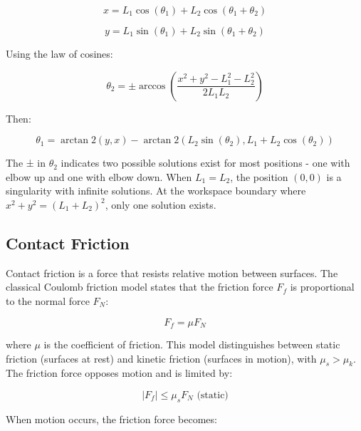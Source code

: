     \begin{equation}
    x = L_1 \cos(\theta_1) + L_2 \cos(\theta_1 + \theta_2)
    \end{equation}
    
    \begin{equation}
    y = L_1 \sin(\theta_1) + L_2 \sin(\theta_1 + \theta_2)
    \end{equation}
    
    Using the law of cosines:
    
    \begin{equation}
    \theta_2 = \pm \arccos\left(\frac{x^2 + y^2 - L_1^2 - L_2^2}{2L_1L_2}\right)
    \end{equation}
    
    Then:
    
    \begin{equation}
    \theta_1 = \arctan2(y,x) - \arctan2(L_2\sin(\theta_2), L_1 + L_2\cos(\theta_2))
    \end{equation}
    
    The ± in \(\theta_2\) indicates two possible solutions exist for most positions - one with elbow up and one with elbow down. When \(L_1 = L_2\), the position \((0,0)\) is a singularity with infinite solutions. At the workspace boundary where \(x^2 + y^2 = (L_1 + L_2)^2\), only one solution exists.

\subsection{Contact Friction}
\label{sec:contact_friction}
Contact friction is a force that resists relative motion between surfaces. The classical Coulomb friction model states that the friction force \(F_f\) is proportional to the normal force \(F_N\):

\begin{equation}
\label{eq:coulomb_friction}
F_f = \mu F_N
\end{equation}

where \(\mu\) is the coefficient of friction. This model distinguishes between static friction (surfaces at rest) and kinetic friction (surfaces in motion), with \(\mu_s > \mu_k\). The friction force opposes motion and is limited by:

\begin{equation}
\label{eq:friction_inequality}
|F_f| \leq \mu_s F_N \text{ (static)}
\end{equation}

When motion occurs, the friction force becomes:

